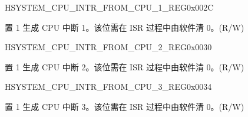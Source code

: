 \begin{register}{H}{SYSTEM\_CPU\_INTR\_FROM\_CPU\_1\_REG}{0x002C}\label{regdesc:SYSTEMCPUINTRFROMCPU1REG}
%
%
\regnewline%
\begin{regdesc}\begin{reglist}
\label{fielddesc:SYSTEMCPUINTRFROMCPU1}\item [SYSTEM\_CPU\_INTR\_FROM\_CPU\_1]置 1 生成 CPU 中断 1。该位需在 ISR 过程中由软件清 0。(R/W)
\end{reglist}\end{regdesc}
\end{register}


\begin{register}{H}{SYSTEM\_CPU\_INTR\_FROM\_CPU\_2\_REG}{0x0030}\label{regdesc:SYSTEMCPUINTRFROMCPU2REG}
%
%
\regnewline%
\begin{regdesc}\begin{reglist}
\label{fielddesc:SYSTEMCPUINTRFROMCPU2}\item [SYSTEM\_CPU\_INTR\_FROM\_CPU\_2] 置 1 生成 CPU 中断 2。该位需在 ISR 过程中由软件清 0。(R/W)
\end{reglist}\end{regdesc}
\end{register}


\begin{register}{H}{SYSTEM\_CPU\_INTR\_FROM\_CPU\_3\_REG}{0x0034}\label{regdesc:SYSTEMCPUINTRFROMCPU3REG}
%
%
\regnewline%
\begin{regdesc}\begin{reglist}
\label{fielddesc:SYSTEMCPUINTRFROMCPU3}\item [SYSTEM\_CPU\_INTR\_FROM\_CPU\_3] 置 1 生成 CPU 中断 3。该位需在 ISR 过程中由软件清 0。(R/W)
\end{reglist}\end{regdesc}
\end{register}


